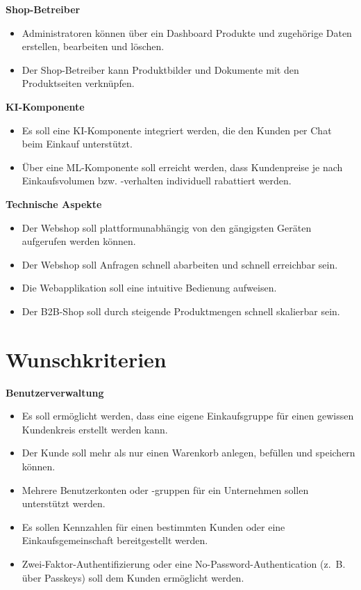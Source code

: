 \documentclass[%
	12pt,
	a4paper,
	oneside,
	parskip=full
]{scrbook}
\begin{document}
	\vspace{0.5cm}
	\textbf{Shop-Betreiber}
	\begin{itemize}
		\item Administratoren können über ein Dashboard Produkte und zugehörige Daten erstellen, bearbeiten und löschen.
		\item Der Shop-Betreiber kann Produktbilder und Dokumente mit den Produktseiten verknüpfen.
	\end{itemize}

	\vspace{0.5cm}
	\textbf{KI-Komponente}
	\begin{itemize}
		\item Es soll eine KI-Komponente integriert werden, die den Kunden per Chat beim Einkauf unterstützt.
		\item Über eine ML-Komponente soll erreicht werden, dass Kundenpreise je nach Einkaufsvolumen bzw. -verhalten individuell rabattiert werden.
	\end{itemize}

	\vspace{0.5cm}
	\textbf{Technische Aspekte}
	\begin{itemize}
		\item Der Webshop soll plattformunabhängig von den gängigsten Geräten aufgerufen werden können.
		\item Der Webshop soll Anfragen schnell abarbeiten und schnell erreichbar sein.
		\item Die Webapplikation soll eine intuitive Bedienung aufweisen.
		\item Der B2B-Shop soll durch steigende Produktmengen schnell skalierbar sein.
	\end{itemize}

\section{Wunschkriterien}
	\vspace{0.5cm}
	\textbf{Benutzerverwaltung}
	\begin{itemize}
		\item Es soll ermöglicht werden, dass eine eigene Einkaufsgruppe für einen gewissen Kundenkreis erstellt werden kann.
		\item Der Kunde soll mehr als nur einen Warenkorb anlegen, befüllen und speichern können.
		\item Mehrere Benutzerkonten oder -gruppen für ein Unternehmen sollen unterstützt werden.
		\item Es sollen Kennzahlen für einen bestimmten Kunden oder eine Einkaufsgemeinschaft bereitgestellt werden.
		\item Zwei-Faktor-Authentifizierung oder eine No-Password-Authentication (z.~B. über Passkeys) soll dem Kunden ermöglicht werden.
	\end{itemize}
\end{document}
